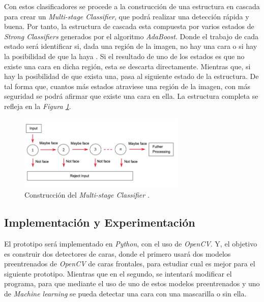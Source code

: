 Con estos clasificadores se procede a la construcción de una estructura en cascada para crear un \textit{Multi-stage Classifier}, que podrá realizar una detección rápida y buena. Por tanto, la estructura de cascada esta compuesta por varios estados de \textit{Strong Classifiers} generados por el algoritmo \textit{AdaBoost}. Donde el trabajo de cada estado será identificar si, dada una región de la imagen, no hay una cara o si hay la posibilidad de que la haya \cite{adaboost1}. Si el resultado de uno de los estados es que no existe una cara en dicha región, esta se descarta directamente. Mientras que, si hay la posibilidad de que exista una, pasa al siguiente estado de la estructura. De tal forma que, cuantos más estados atraviese una región de la imagen, con más seguridad se podrá afirmar que existe una cara en ella. La estructura completa se refleja en la \textit{Figura \ref{fig:ada2}}.

\begin{figure}[htp]
	\centering
	\includegraphics[width=8cm]{imagenes/ada2.png}
	\caption[Construcción del \textit{Multi-stage Classifier}]{Construcción del \textit{Multi-stage Classifier} \cite{adaboost2}.}
	\label{fig:ada2}
\end{figure}

\vspace{-0.7cm}
\subsection*{Implementación y Experimentación}
\vspace{-0.5cm}
El prototipo será implementado en \textit{Python}, con el uso de \textit{OpenCV}. Y, el objetivo es construir dos detectores de caras, donde el primero usará dos modelos preentrenados de \textit{OpenCV} de caras frontales, para estudiar cual es mejor para el siguiente prototipo. Mientras que en el segundo, se intentará modificar el programa, para que mediante el uso de uno de estos modelos preentrenados y uno de \textit{Machine learning} se pueda detectar una cara con una mascarilla o sin ella.

